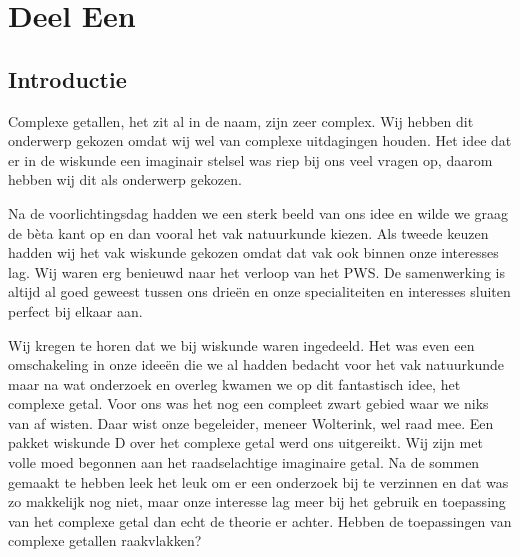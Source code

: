 \documentclass[11pt,fleqn]{book} %
\begin{document}
\usechapterimagefalse %


\pagestyle{empty} %

\tableofcontents %

\cleardoublepage %

\pagestyle{fancy} %


\part{Deel Een}



\chapter{Introductie}

Complexe getallen, het zit al in de naam, zijn zeer complex. Wij hebben dit onderwerp gekozen omdat wij wel van complexe uitdagingen houden. Het idee dat er in de wiskunde een imaginair stelsel was riep bij ons veel vragen op, daarom hebben wij dit als onderwerp gekozen.

Na de voorlichtingsdag hadden we een sterk beeld van ons idee en wilde we graag de bèta kant op en dan vooral het vak natuurkunde kiezen. Als tweede keuzen hadden wij het vak wiskunde gekozen omdat dat vak ook binnen onze interesses lag. Wij waren erg benieuwd naar het verloop van het PWS. De samenwerking is altijd al goed geweest tussen ons drieën en onze specialiteiten en interesses sluiten perfect bij elkaar aan.

Wij kregen te horen dat we bij wiskunde waren ingedeeld. Het was even een omschakeling in onze ideeën die we al hadden bedacht voor het vak natuurkunde maar na wat onderzoek en overleg kwamen we op dit fantastisch idee, het complexe getal. Voor ons was het nog een compleet zwart gebied waar we niks van af wisten. Daar wist onze begeleider, meneer Wolterink, wel raad mee. Een pakket wiskunde D over het complexe getal werd ons uitgereikt. Wij zijn met volle moed begonnen aan het raadselachtige imaginaire getal. Na de sommen gemaakt te hebben leek het leuk om er een onderzoek bij te verzinnen en dat was zo makkelijk nog niet, maar onze interesse lag meer bij het gebruik en toepassing van het complexe getal dan echt de theorie er achter. Hebben de toepassingen van complexe getallen raakvlakken?
\end{document}
